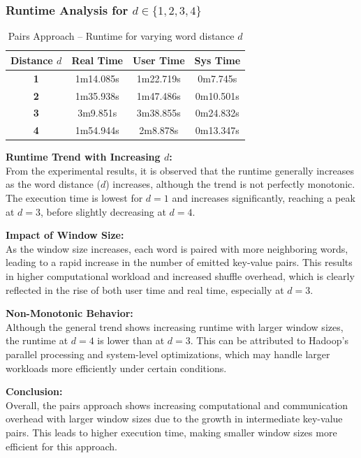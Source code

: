 \documentclass[12pt,a4paper]{article}
\begin{document}
\subsubsection{Runtime Analysis for $d \in \{1, 2, 3, 4\}$}

\begin{table}[H]
  \centering
  \caption{Pairs Approach -- Runtime for varying word distance $d$}
  \label{tab:pairs_runtime}
  \renewcommand{\arraystretch}{1.4}
  \begin{tabular}{>{\bfseries}c ccc}
    \toprule
    \rowcolor{lightblue}
    \textbf{Distance $d$} & \textbf{Real Time} & \textbf{User Time} & \textbf{Sys Time} \\
    \midrule
    1 & 1m14.085s & 1m22.719s & 0m7.745s \\
    2 & 1m35.938s & 1m47.486s & 0m10.501s \\
    3 & 3m9.851s  & 3m38.855s & 0m24.832s \\
    4 & 1m54.944s & 2m8.878s  & 0m13.347s \\
    \bottomrule
  \end{tabular}
\end{table}

\begin{infobox}
  \textbf{Runtime Trend with Increasing $d$:} \\
  From the experimental results, it is observed that the runtime generally increases as the word distance ($d$) increases, although the trend is not perfectly monotonic. The execution time is lowest for $d = 1$ and increases significantly, reaching a peak at $d = 3$, before slightly decreasing at $d = 4$.
  \vspace{0.5em}

  \textbf{Impact of Window Size:} \\
  As the window size increases, each word is paired with more neighboring words, leading to a rapid increase in the number of emitted key-value pairs. This results in higher computational workload and increased shuffle overhead, which is clearly reflected in the rise of both user time and real time, especially at $d = 3$.
  \vspace{0.5em}

  \textbf{Non-Monotonic Behavior:} \\
  Although the general trend shows increasing runtime with larger window sizes, the runtime at $d = 4$ is lower than at $d = 3$. This can be attributed to Hadoop’s parallel processing and system-level optimizations, which may handle larger workloads more efficiently under certain conditions.
  \vspace{0.5em}

  \textbf{Conclusion:} \\
  Overall, the pairs approach shows increasing computational and communication overhead with larger window sizes due to the growth in intermediate key-value pairs. This leads to higher execution time, making smaller window sizes more efficient for this approach.
\end{infobox}
\end{document}
